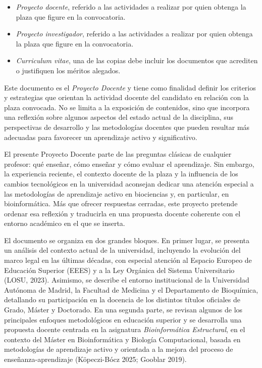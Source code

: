 \documentclass[
  11pt,
  a4paper,
  twoside]{scrreprt}
\begin{document}
\begin{itemize}
\item
  \emph{Proyecto docente}, referido a las actividades a realizar por
  quien obtenga la plaza que figure en la convocatoria.
\item
  \emph{Proyecto investigador}, referido a las actividades a realizar
  por quien obtenga la plaza que figure en la convocatoria.
\item
  \emph{Curriculum vitae}, una de las copias debe incluir los documentos
  que acrediten o justifiquen los méritos alegados.
\end{itemize}

Este documento es el \emph{Proyecto Docente} y tiene como finalidad
definir los criterios y estrategias que orientan la actividad docente
del candidato en relación con la plaza convocada. No se limita a la
exposición de contenidos, sino que incorpora una reflexión sobre algunos
aspectos del estado actual de la disciplina, sus perspectivas de
desarrollo y las metodologías docentes que pueden resultar más adecuadas
para favorecer un aprendizaje activo y significativo.

El presente Proyecto Docente parte de las preguntas clásicas de
cualquier profesor: qué enseñar, cómo enseñar y cómo evaluar el
aprendizaje. Sin embargo, la experiencia reciente, el contexto docente
de la plaza y la influencia de los cambios tecnológicos en la
universidad aconsejan dedicar una atención especial a las metodologías
de aprendizaje activo en biociencias y, en particular, en
bioinformática. Más que ofrecer respuestas cerradas, este proyecto
pretende ordenar esa reflexión y traducirla en una propuesta docente
coherente con el entorno académico en el que se inserta.

El documento se organiza en dos grandes bloques. En primer lugar, se
presenta un análisis del contexto actual de la universidad, incluyendo
la evolución del marco legal en las últimas décadas, con especial
atención al Espacio Europeo de Educación Superior (EEES) y a la Ley
Orgánica del Sistema Universitario (LOSU, 2023). Asimismo, se describe
el entorno institucional de la Universidad Autónoma de Madrid, la
Facultad de Medicina y el Departamento de Bioquímica, detallando su
participación en la docencia de los distintos títulos oficiales de
Grado, Máster y Doctorado. En una segunda parte, se revisan algunos de
los principales enfoques metodológicos en educación superior y se
desarrolla una propuesta docente centrada en la asignatura
\emph{Bioinformática Estructural}, en el contexto del Máster en
Bioinformática y Biología Computacional, basada en metodologías de
aprendizaje activo y orientada a la mejora del proceso de
enseñanza-aprendizaje (Köpeczi-Bócz 2025; Gooblar 2019).
\end{document}
